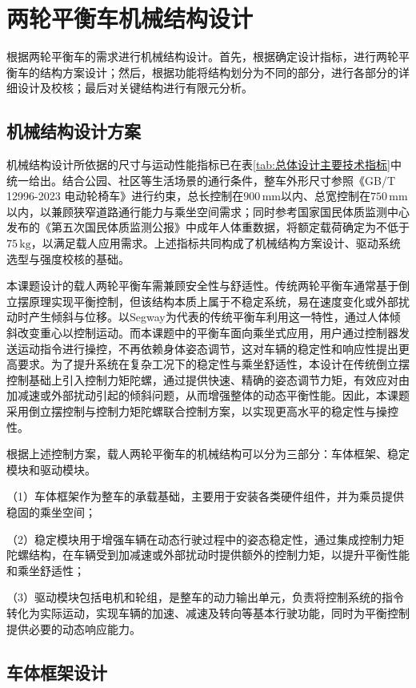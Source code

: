 \section{两轮平衡车机械结构设计}

根据两轮平衡车的需求进行机械结构设计。首先，根据确定设计指标，进行两轮平衡车的结构方案设计；然后，根据功能将结构划分为不同的部分，进行各部分的详细设计及校核；最后对关键结构进行有限元分析。

\subsection{机械结构设计方案}

机械结构设计所依据的尺寸与运动性能指标已在表\ref{tab:总体设计主要技术指标}中统一给出。结合公园、社区等生活场景的通行条件，整车外形尺寸参照《GB/T 12996-2023 电动轮椅车》进行约束，总长控制在$900\,\mathrm{mm}$以内、总宽控制在$750\,\mathrm{mm}$以内，以兼顾狭窄道路通行能力与乘坐空间需求；同时参考国家国民体质监测中心发布的《第五次国民体质监测公报》中成年人体重数据，将额定载荷确定为不低于$75\,\mathrm{kg}$，以满足载人应用需求。上述指标共同构成了机械结构方案设计、驱动系统选型与强度校核的基础。

本课题设计的载人两轮平衡车需兼顾安全性与舒适性。传统两轮平衡车通常基于倒立摆原理实现平衡控制，但该结构本质上属于不稳定系统，易在速度变化或外部扰动时产生倾斜与位移。以Segway为代表的传统平衡车利用这一特性，通过人体倾斜改变重心以控制运动。而本课题中的平衡车面向乘坐式应用，用户通过控制器发送运动指令进行操控，不再依赖身体姿态调节，这对车辆的稳定性和响应性提出更高要求。为了提升系统在复杂工况下的稳定性与乘坐舒适性，本设计在传统倒立摆控制基础上引入控制力矩陀螺，通过提供快速、精确的姿态调节力矩，有效应对由加减速或外部扰动引起的倾斜问题，从而增强整体的动态平衡性能。因此，本课题采用倒立摆控制与控制力矩陀螺联合控制方案，以实现更高水平的稳定性与操控性。

根据上述控制方案，载人两轮平衡车的机械结构可以分为三部分：车体框架、稳定模块和驱动模块。

（1）车体框架作为整车的承载基础，主要用于安装各类硬件组件，并为乘员提供稳固的乘坐空间；

（2）稳定模块用于增强车辆在动态行驶过程中的姿态稳定性，通过集成控制力矩陀螺结构，在车辆受到加减速或外部扰动时提供额外的控制力矩，以提升平衡性能和乘坐舒适性；

（3）驱动模块包括电机和轮组，是整车的动力输出单元，负责将控制系统的指令转化为实际运动，实现车辆的加速、减速及转向等基本行驶功能，同时为平衡控制提供必要的动态响应能力。

\subsection{车体框架设计}


